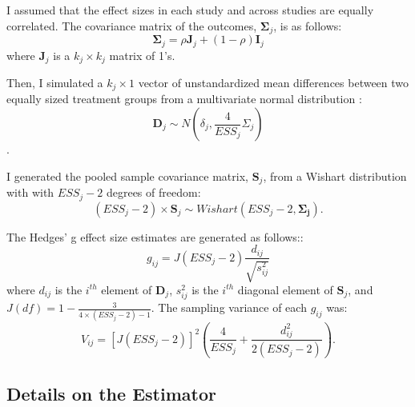 I assumed that the effect sizes in each study and across studies are equally correlated. The covariance matrix of the outcomes, $\mathbf{\Sigma}_j$, is as follows:
\begin{equation}
    \mathbf{\Sigma}_j = \rho \mathbf{J}_j + (1 - \rho)\mathbf{I}_j
\end{equation}
where $\mathbf{J}_j$ is a $k_j \times k_j$ matrix of 1's.

Then, I simulated a $k_j \times 1$ vector of unstandardized mean differences between two equally sized treatment groups from a multivariate normal distribution \autocite{pustejovsky2022}:
\begin{equation}
    \mathbf{D}_j \sim N(\delta_j, \frac{4}{ESS_j}\Sigma_j)
\end{equation}.

I generated the pooled sample covariance matrix, $\mathbf{S}_j$,  from a Wishart distribution with with $ESS_j -2$ degrees of freedom:
\begin{equation}
    (ESS_j -2) \times \mathbf{S}_j \sim Wishart(ESS_j - 2, \mathbf{\Sigma_j}).
\end{equation}

The Hedges' g effect size estimates are generated as follows::
\begin{equation}
    g_{ij} = J\left(ESS_j-2\right) \frac{d_{ij}}{\sqrt{s^2_{ij}}} 
\end{equation}
where $d_{ij}$ is the $i^{th}$ element of $\mathbf{D}_j$, $s^2_{ij}$ is the $i^{th}$ diagonal element of $\mathbf{S}_j$, and $J(df) = 1 - \frac{3}{4 \times (ESS_j -2) -1}$. The sampling variance of each $g_{ij}$ was:
\begin{equation}
    V_{ij} = \left[  J\left(ESS_j-2\right)\right]^2 \left( \frac{4}{ESS_j} + \frac{d^2_{ij}}{2(ESS_j -2)}\right).
\end{equation}


\subsection{Details on the Estimator}

